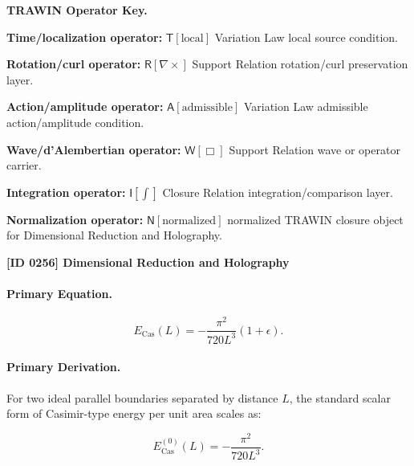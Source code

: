 \par\vspace{0.45\baselineskip}
\noindent\begin{minipage}[t]{\linewidth}
\begingroup
\small
\raggedright
\textbf{TRAWIN Operator Key.}\par
\noindent\textbf{Time/localization operator:} $\mathsf{T}\!\left[\mathrm{local}\right]$ Variation Law local source condition.\par
\noindent\textbf{Rotation/curl operator:} $\mathsf{R}\!\left[\nabla\times\right]$ Support Relation rotation/curl preservation layer.\par
\noindent\textbf{Action/amplitude operator:} $\mathsf{A}\!\left[\mathrm{admissible}\right]$ Variation Law admissible action/amplitude condition.\par
\noindent\textbf{Wave/d'Alembertian operator:} $\mathsf{W}\!\left[\Box\right]$ Support Relation wave or operator carrier.\par
\noindent\textbf{Integration operator:} $\mathsf{I}\!\left[\int\right]$ Closure Relation integration/comparison layer.\par
\noindent\textbf{Normalization operator:} $\mathsf{N}\!\left[\mathrm{normalized}\right]$ normalized TRAWIN closure object for Dimensional Reduction and Holography.\par
\endgroup
\end{minipage}

\clearpage
\noindent\textbf{[ID 0256] Dimensional Reduction and Holography}\par
\vspace{0.35em}
\paragraph{Primary Equation.}
\begin{equation}
E_{\mathrm{Cas}}(L)
=
-\frac{\pi^2}{720L^3}(1+\epsilon).
\end{equation}

\paragraph{Primary Derivation.}
For two ideal parallel boundaries separated by distance $L$, the standard scalar form of Casimir-type energy per unit area scales as:

\begin{equation}
E_{\mathrm{Cas}}^{(0)}(L)
=
-\frac{\pi^2}{720L^3}.
\end{equation}

